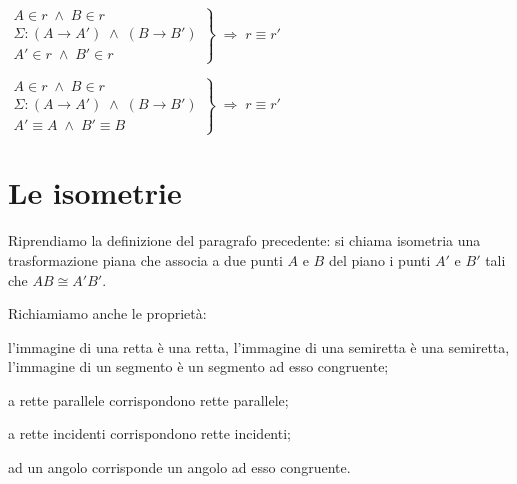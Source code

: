
\noindent\begin{minipage}{0.6\textwidth}\parindent15pt
\noindent $\left.\begin{array}{lll} A\in r \;\wedge\; B\in r\\ \Sigma : (A\rightarrow A') \;\wedge\; (B\rightarrow B')\\ A'\in r \;\wedge\; B'\in r \end{array}\right\} \;\Rightarrow\; r\equiv r'$
\end{minipage}\hfil
\begin{minipage}{0.4\textwidth}
	\centering
\end{minipage}\vspace{8pt}

\noindent\begin{minipage}{0.6\textwidth}\parindent15pt
\noindent $\left.\begin{array}{lll} A\in r \;\wedge\; B\in r\\ \Sigma : (A\rightarrow A') \;\wedge\; (B\rightarrow B')\\ A'\equiv A \;\wedge\; B'\equiv B \end{array}\right\} \;\Rightarrow\; r\equiv r'$
\end{minipage}\hfil
\begin{minipage}{0.4\textwidth}
	\centering
\end{minipage}


\section{Le isometrie}\label{sect:isometrie}

Riprendiamo la definizione del paragrafo precedente: si chiama isometria una trasformazione piana che associa a due punti $A$ e $B$ del piano i punti $A'$ e $B'$ tali che $AB\cong A'B'$.

Richiamiamo anche le proprietà:
\begin{itemize*}
\item l'immagine di una retta è una retta, l'immagine di una semiretta è una semiretta, l'immagine di un segmento è un segmento ad esso congruente;
\item a rette parallele corrispondono rette parallele;
\item a rette incidenti corrispondono rette incidenti;
\item ad un angolo corrisponde un angolo ad esso congruente.
\end{itemize*}

